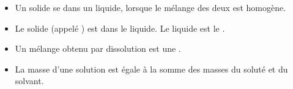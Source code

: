 \begin{mybilan}
	
	\begin{itemize}
		\item Un solide se  dans un liquide, lorsque le mélange des deux est homogène.\pause
		 
		 
		 \item Le solide (appelé ) est  dans le liquide. Le liquide est le .\pause
		 
		 \item Un mélange obtenu par dissolution est une .\pause
		 
		 \item La masse d'une solution est égale à la somme des masses du soluté et du solvant.\pause
		 
		 
	\end{itemize}


\end{mybilan}